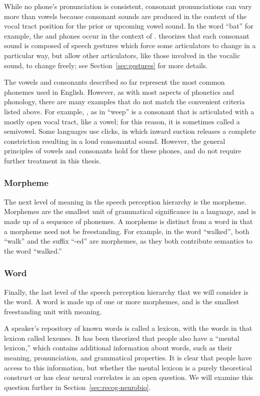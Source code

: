 While no phone's pronunciation is consistent,
consonant pronunciations can vary more than vowels
because consonant sounds are produced in the context
of the vocal tract position for
the prior or upcoming vowel sound.
In the word ``bat'' for example,
the \ipa{[b]} and \ipa{[t]} phones
occur in the context of \ipa{[\ae]}.
\citet{kroger1993} theorizes that
each consonant sound is composed
of speech gestures which force some
articulators to change in a particular way,
but allow other articulators,
like those involved in the vocalic sound,
to change freely;
see Section~\ref{sec:gestures}
for more details.

The vowels and consonants described so far
represent the most common phonemes used
in English.
However, as with most aspects
of phonetics and phonology,
there are many examples that do not
match the convenient criteria listed above.
For example, \ipa{[w]}, as in ``weep''
is a consonant that is articulated
with a mostly open vocal tract,
like a vowel;
for this reason, it is sometimes called a semivowel.
Some languages use clicks,
in which inward suction releases a complete constriction
resulting in a loud consonantal sound.
However, the general principles
of vowels and consonants hold
for these phones,
and do not require further treatment
in this thesis.

\subsubsection{Morpheme}

The next level of meaning in the
speech perception hierarchy
is the morpheme.
Morphemes are the smallest unit
of grammatical significance
in a language,
and is made up of a sequence
of phonemes.
A morpheme is distinct
from a word in that
a morpheme need not be freestanding.
For example, in the word
``walked'', both ``walk''
and the suffix ``-ed''
are morphemes,
as they both contribute
semantics to the word ``walked.''

\subsubsection{Word}

Finally, the last level
of the speech perception hierarchy
that we will consider is the word.
A word is made up of
one or more morphemes,
and is the smallest freestanding unit
with meaning.

A speaker's repository of known words
is called a lexicon,
with the words in that lexicon
called lexemes.
It has been theorized that
people also have a ``mental lexicon,''
which contains additional information
about words,
such as their meaning, pronunciation,
and grammatical properties.
It is clear that people have access
to this information,
but whether the mental lexicon
is a purely theoretical construct
or has clear neural correlates
is an open question.
We will examine this question
further in Section~\ref{sec:recog-neurobio}.

